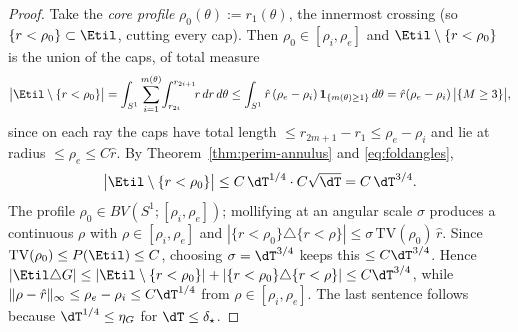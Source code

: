 \begin{proof}
Take the \emph{core profile} $\rho_0(\theta):=r_1(\theta)$, the innermost
crossing (so $\{r<\rho_0\}\subset\Etil$, cutting every cap). Then
$\rho_0\in[\rho_i,\rho_e]$ and $\Etil\setminus\{r<\rho_0\}$ is the union of
the caps, of total measure
\[
   \bigl|\Etil\setminus\{r<\rho_0\}\bigr|
   =\int_{S^1}\sum_{i=1}^{m(\theta)}\!\int_{r_{2i}}^{r_{2i+1}}\!\!r\,dr\,d\theta
   \le\int_{S^1}\hat r\,(\rho_e-\rho_i)\,\mathbf 1_{\{m(\theta)\ge1\}}\,d\theta
   =\hat r(\rho_e-\rho_i)\,\bigl|\{M\ge3\}\bigr|,
\]
since on each ray the caps have total length $\le r_{2m+1}-r_1\le\rho_e-
\rho_i$ and lie at radius $\le\rho_e\le C\hat r$. By
Theorem~\ref{thm:perim-annulus} and \eqref{eq:foldangles},
\[
   \bigl|\Etil\setminus\{r<\rho_0\}\bigr|
   \le C\,\dT^{1/4}\cdot C\sqrt\dT=C\,\dT^{3/4}.
\]
The profile $\rho_0\in BV(S^1;[\rho_i,\rho_e])$; mollifying at an angular
scale $\sigma$ produces a continuous $\rho$ with $\rho\in[\rho_i,\rho_e]$
and $|\{r<\rho_0\}\triangle\{r<\rho\}|\le\sigma\,\mathrm{TV}(\rho_0)\,\hat r$.
Since $\mathrm{TV}(\rho_0)\le P(\Etil)\le C$, choosing $\sigma=\dT^{3/4}$
keeps this $\le C\dT^{3/4}$. Hence $|\Etil\triangle G|\le|\Etil\setminus
\{r<\rho_0\}|+|\{r<\rho_0\}\triangle\{r<\rho\}|\le C\dT^{3/4}$, while
$\|\rho-\hat r\|_\infty\le\rho_e-\rho_i\le C\dT^{1/4}$ from
$\rho\in[\rho_i,\rho_e]$. The last sentence follows because
$\dT^{1/4}\le\eta_G$ for $\dT\le\delta_\star$.
\end{proof}

